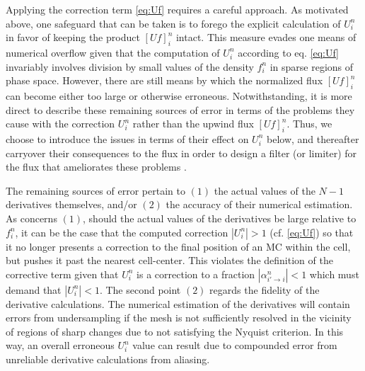 \documentclass[11pt,titlepage]{report}
\begin{document}
\indent \indent Applying the correction term \eqref{eq:Uf} requires a careful approach. As motivated above, one safeguard that can be taken is to forego the explicit calculation of $U_i^n$ in favor of keeping the product $[Uf]_i^n$ intact. This measure evades one means of numerical overflow given that the computation of $U_i^n$ according to eq. \eqref{eq:Uf} invariably involves division by small values of the density $f_i^n$ in sparse regions of phase space. However, there are still means by which the normalized flux $[Uf]_i^n$ can become either too large or otherwise erroneous. Notwithstanding, it is more direct to describe these remaining sources of error in terms of the problems they cause with the correction $U_i^n$ rather than the upwind flux $[Uf]_i^n$. Thus, we choose to introduce the issues in terms of their effect on $U_i^n$ below, and thereafter carryover their consequences to the flux in order to design a filter (or limiter) for the flux that ameliorates these problems \cite{Guclu14}.

The remaining sources of error pertain to $(1)$ the actual values of the $N-1$ derivatives themselves, and/or $(2)$ the accuracy of their numerical estimation. As concerns $(1)$, should the actual values of the derivatives be large relative to $f_i^n$, it can be the case that the computed correction $|U_i^n| > 1$ (cf. \eqref{eq:Uf}) so that it no longer presents a correction to the final position of an MC within the cell, but pushes it past the nearest cell-center. This violates the definition of the corrective term given that $U_i^n$ is a correction to a fraction $|\alpha_{i'\to i}^n| < 1$ which must demand that $|U_i^n| < 1$. The second point $(2)$ regards the fidelity of the derivative calculations. The numerical estimation of the derivatives will contain errors from undersampling if the mesh is not sufficiently resolved in the vicinity of regions of sharp changes due to not satisfying the Nyquist criterion. In this way, an overall erroneous $U_i^n$ value can result due to compounded error from unreliable derivative calculations from aliasing.
\end{document}
